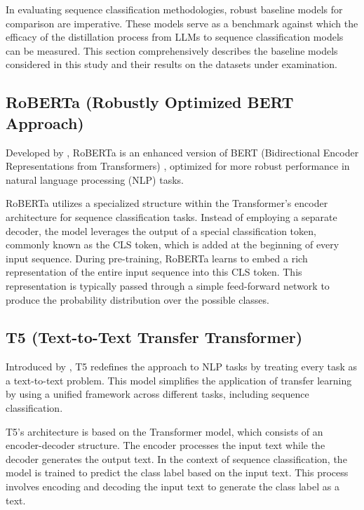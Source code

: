 In evaluating sequence classification methodologies, robust baseline models for comparison are imperative. These models serve as a benchmark against which the efficacy of the distillation process from LLMs to sequence classification models can be measured. This section comprehensively describes the baseline models considered in this study and their results on the datasets under examination.

\subsection{RoBERTa (Robustly Optimized BERT Approach)}

Developed by \citeauthor{roberta} \cite{roberta}, RoBERTa is an enhanced version of BERT (Bidirectional Encoder Representations from Transformers) \cite{bert}, optimized for more robust performance in natural language processing (NLP) tasks.

RoBERTa utilizes a specialized structure within the Transformer's encoder architecture for sequence classification tasks. Instead of employing a separate decoder, the model leverages the output of a special classification token, commonly known as the CLS token, which is added at the beginning of every input sequence. During pre-training, RoBERTa learns to embed a rich representation of the entire input sequence into this CLS token. This representation is typically passed through a simple feed-forward network to produce the probability distribution over the possible classes.

\subsection{T5 (Text-to-Text Transfer Transformer)}

Introduced by \citeauthor{t5} \cite{t5}, T5 redefines the approach to NLP tasks by treating every task as a text-to-text problem. This model simplifies the application of transfer learning by using a unified framework across different tasks, including sequence classification.

T5's architecture is based on the Transformer model, which consists of an encoder-decoder structure. The encoder processes the input text while the decoder generates the output text. In the context of sequence classification, the model is trained to predict the class label based on the input text. This process involves encoding and decoding the input text to generate the class label as a text.

